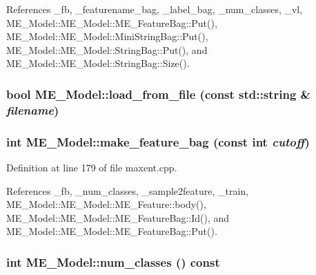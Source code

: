 References \_\-fb, \_\-featurename\_\-bag, \_\-label\_\-bag, \_\-num\_\-classes, \_\-vl, ME\_\-Model::ME\_\-Model::ME\_\-FeatureBag::Put(), ME\_\-Model::ME\_\-Model::MiniStringBag::Put(), ME\_\-Model::ME\_\-Model::StringBag::Put(), and ME\_\-Model::ME\_\-Model::StringBag::Size().\hypertarget{classME__Model_a1e19dc4d15bc1c0f4602a1bbd9174a4}{
\subsubsection[{load\_\-from\_\-file}]{\setlength{\rightskip}{0pt plus 5cm}bool ME\_\-Model::load\_\-from\_\-file (const std::string \& {\em filename})}}
\label{classME__Model_a1e19dc4d15bc1c0f4602a1bbd9174a4}


\hypertarget{classME__Model_44b71ee757d6494e852ea36bacfe6634}{
\subsubsection[{make\_\-feature\_\-bag}]{\setlength{\rightskip}{0pt plus 5cm}int ME\_\-Model::make\_\-feature\_\-bag (const int {\em cutoff})}}
\label{classME__Model_44b71ee757d6494e852ea36bacfe6634}




Definition at line 179 of file maxent.cpp.

References \_\-fb, \_\-num\_\-classes, \_\-sample2feature, \_\-train, ME\_\-Model::ME\_\-Model::ME\_\-Feature::body(), ME\_\-Model::ME\_\-Model::ME\_\-FeatureBag::Id(), and ME\_\-Model::ME\_\-Model::ME\_\-FeatureBag::Put().\hypertarget{classME__Model_eb9794bcc52f8a3a811ac81965ba49ce}{
\subsubsection[{num\_\-classes}]{\setlength{\rightskip}{0pt plus 5cm}int ME\_\-Model::num\_\-classes () const}}
\label{classME__Model_eb9794bcc52f8a3a811ac81965ba49ce}




